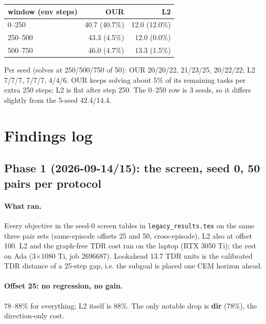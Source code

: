 \documentclass[11pt]{article}
\begin{document}
\begin{center}\small
\begin{tabular}{lrr}
\toprule
window (env steps) & OUR & L2 \\
\midrule
0--250   & 40.7 (40.7\%) & 12.0 (12.0\%) \\
250--500 & 43.3 (4.5\%)  & 12.0 (0.0\%) \\
500--750 & 46.0 (4.7\%)  & 13.3 (1.5\%) \\
\bottomrule
\end{tabular}
\end{center}

Per seed (solves at 250/500/750 of 50): OUR 20/20/22, 21/23/25, 20/22/22; L2 7/7/7, 7/7/7,
4/4/6. OUR keeps solving about 5\% of its remaining tasks per extra 250 steps; L2 is flat after
step 250. The 0--250 row is 3 seeds, so it differs slightly from the 5-seed 42.4/14.4.

\section{Findings log}

\subsection{Phase 1 (2026-09-14/15): the screen, seed 0, 50 pairs per protocol}
\paragraph{What ran.} Every objective in the seed-0 screen tables in \texttt{legacy\_results.tex} on the same three pair
sets (same-episode offsets 25 and 50, cross-episode), L2 also at offset 100. L2 and the
graph-free TDR cost ran on the laptop (RTX 3050 Ti); the rest on Ada (3$\times$1080 Ti, job
2696687). Lookahead 13.7 TDR units is the calibrated TDR distance of a 25-step gap, i.e.
the subgoal is placed one CEM horizon ahead.

\paragraph{Offset 25: no regression, no gain.} 78--88\% for everything; L2 itself is 88\%.
The only notable drop is \textbf{dir} (78\%), the direction-only cost.
\end{document}
